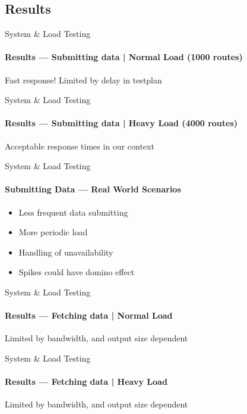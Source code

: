 \subsection{Results}
\begin{frame}[fragile]{System \& Load Testing}
    \framesubtitle{Results --- Submitting data | Normal Load (1000 routes)}
    Fast response! Limited by delay in testplan
    \begin{figure}[htb]
        \centering
    \end{figure}
\end{frame}
\begin{frame}[fragile]{System \& Load Testing}
    \framesubtitle{Results --- Submitting data | Heavy Load (4000 routes)}
    Acceptable response times in our context
    \begin{figure}[htb]
        \centering
    \end{figure}
\end{frame}

\begin{frame}{System \& Load Testing}
    \framesubtitle{Submitting Data --- Real World Scenarios}
    \begin{itemize}
        \item Less frequent data submitting
        \item More periodic load
        \item Handling of unavailability
        \item Spikes could have domino effect
    \end{itemize}
\end{frame}

\begin{frame}[fragile]{System \& Load Testing}
    \framesubtitle{Results --- Fetching data | Normal Load}
    Limited by bandwidth, and output size dependent
    \begin{figure}[htb]
        \centering
    \end{figure}
\end{frame}
\begin{frame}[fragile]{System \& Load Testing}
    \framesubtitle{Results --- Fetching data | Heavy Load}
    Limited by bandwidth, and output size dependent
    \begin{figure}[htb]
        \centering
    \end{figure}
\end{frame}

